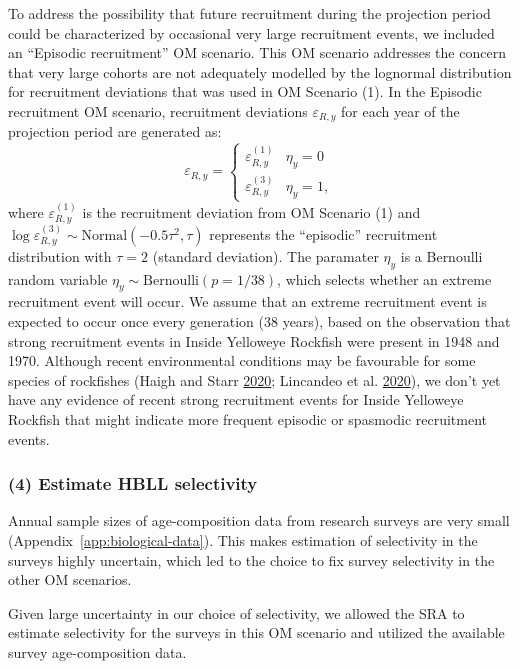 \documentclass[11pt]{book}
\begin{document}
To address the possibility that future recruitment during the projection period could be characterized by occasional very large recruitment events, we included an ``Episodic recruitment'' OM scenario. This OM scenario addresses the concern that very large cohorts are not adequately modelled by the lognormal distribution for recruitment deviations that was used in OM Scenario (1). In the Episodic recruitment OM scenario, recruitment deviations \(\varepsilon_{R,y}\) for each year of the projection period are generated as:
\begin{equation}
\varepsilon_{R,y} = 
\left\{
\begin{array}{ll}
\varepsilon^{(1)}_{R,y} & \eta_y = 0\\
\varepsilon^{(3)}_{R,y} & \eta_y = 1,
\end{array}
\right.
\end{equation}
where \(\varepsilon^{(1)}_{R,y}\) is the recruitment deviation from OM Scenario (1) and \(\log\varepsilon^{(3)}_{R,y} \sim \textrm{Normal}(-0.5\tau^2, \tau)\) represents the ``episodic'' recruitment distribution with \(\tau = 2\) (standard deviation). The paramater \(\eta_y\) is a Bernoulli random variable \(\eta_y \sim \textrm{Bernoulli}(p = 1/38)\), which selects whether an extreme recruitment event will occur. We assume that an extreme recruitment event is expected to occur once every generation (38 years), based on the observation that strong recruitment events in Inside Yelloweye Rockfish were present in 1948 and 1970. Although recent environmental conditions may be favourable for some species of rockfishes (Haigh and Starr \protect\hyperlink{ref-haigh2020}{2020}; Lincandeo et al. \protect\hyperlink{ref-lincandeo2020}{2020}), we don't yet have any evidence of recent strong recruitment events for Inside Yelloweye Rockfish that might indicate more frequent episodic or spasmodic recruitment events.

\hypertarget{sec:approach3-reference4}{%
\subsubsection{(4) Estimate HBLL selectivity}\label{sec:approach3-reference4}}

Annual sample sizes of age-composition data from research surveys are very small (Appendix~\ref{app:biological-data}). This makes estimation of selectivity in the surveys highly uncertain, which led to the choice to fix survey selectivity in the other OM scenarios.

Given large uncertainty in our choice of selectivity, we allowed the SRA to estimate selectivity for the surveys in this OM scenario and utilized the available survey age-composition data.
\end{document}
